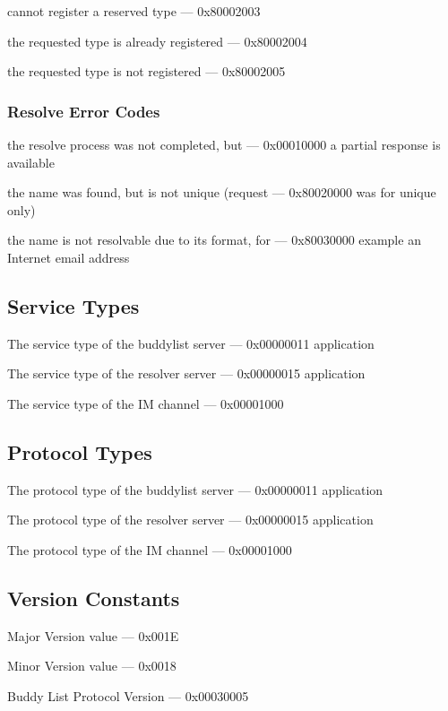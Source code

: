 \documentclass[titlepage,oneside]{book}
\begin{document}
cannot register a reserved type                   --- 0x80002003

the requested type is already registered          --- 0x80002004

the requested type is not registered              --- 0x80002005

\subsubsection{Resolve Error Codes}

the resolve process was not completed, but        --- 0x00010000
a partial response is available

the name was found, but is not unique (request    --- 0x80020000
was for unique only)

the name is not resolvable due to its format, for --- 0x80030000
example an Internet email address

\subsection{Service Types}

The service type of the buddylist server          --- 0x00000011
application

The service type of the resolver server           --- 0x00000015
application

The service type of the IM channel                --- 0x00001000

\subsection{Protocol Types}

The protocol type of the buddylist server         --- 0x00000011
application

The protocol type of the resolver server          --- 0x00000015
application

The protocol type of the IM channel               --- 0x00001000

\subsection{Version Constants}

Major Version value                               --- 0x001E

Minor Version value                               --- 0x0018

Buddy List Protocol Version                          --- 0x00030005
\end{document}
